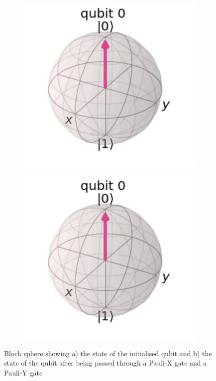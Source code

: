\begin{figure}[h]
    \centering
    \begin{subfigure}[h]{0.33\textwidth}
        \centering
        \includegraphics[width=\textwidth]{lab2/images/bSphX1.png}
        \caption{}
        \label{fig:bSphXY1}
    \end{subfigure}
    \hspace{0.2\textwidth}
    \begin{subfigure}[h]{0.33\textwidth}
        \centering
        \includegraphics[width=\textwidth]{lab2/images/bSphX1.png}
        \caption{}
        \label{fig:bSphXY2}
    \end{subfigure}
    \captionsetup{font = it, labelfont = bf, width=.91\linewidth, justification=centering}
    \caption{Bloch sphere showing a) the state of the initialised qubit and b) the state of the qubit after being passed through a Pauli-X gate and a Pauli-Y gate} 
    \label{fig:xyGateBloc}
\end{figure}

